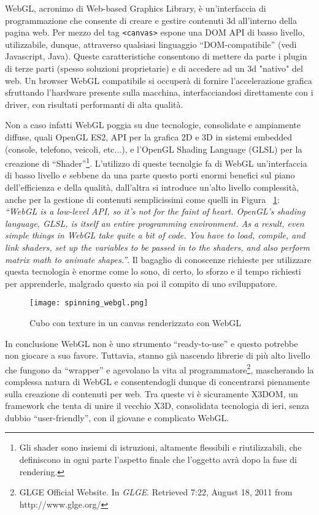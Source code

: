 WebGL, acronimo di Web-based Graphics Library, è un'interfaccia di programmazione che consente di creare e gestire contenuti 3d all'interno della pagina web. Per mezzo del tag \texttt{<canvas>} espone una DOM API di basso livello, utilizzabile, dunque, attraverso qualsiasi linguaggio ``DOM-compatibile'' (vedi Javascript, Java). Queste caratteristiche consentono di mettere da parte i plugin di terze parti (spesso soluzioni proprietarie) e di accedere ad un 3d "nativo" del web. Un browser WebGL compatibile si occuperà di fornire l'accelerazione grafica sfruttando l'hardware presente sulla macchina, interfacciandosi direttamente con i driver, con risultati performanti di alta qualità.

Non a caso infatti WebGL poggia su due tecnologie, consolidate e ampiamente diffuse, quali OpenGL ES2, API per la grafica 2D e 3D in sistemi embedded (console, telefono, veicoli, etc...), e l'OpenGL Shading Language (GLSL) per la creazione di ``Shader''\footnote{Gli shader sono insiemi di istruzioni, altamente flessibili e riutilizzabili, che definiscono in ogni parte l'aspetto finale che l'oggetto avrà dopo la fase di rendering.}. L'utilizzo di queste tecnolgie fa di WebGL un'interfaccia di basso livello e sebbene da una parte questo porti enormi benefici sul piano dell'efficienza e della qualità, dall'altra si introduce un'alto livello complessità, anche per la gestione di contenuti semplicissimi come quelli in Figura ~\ref{label:spinwebgl}: \textit{``WebGL is a low-level API, so it's not for the faint of heart. OpenGL's shading language, GLSL, is itself an entire programming environment. As a result, even simple things in WebGL take quite a bit of code. You have to load, compile, and link shaders, set up the variables to be passed in to the shaders, and also perform matrix math to animate shapes.''}. Il bagaglio di conoscenze richieste per utilizzare questa tecnologia è enorme come lo sono, di certo, lo sforzo e il tempo richiesti per apprenderle, malgrado questo sia poi il compito di uno sviluppatore.

\begin{figure}[Ht]
\centering
\texttt{[image: spinning\_webgl.png]}
\caption{Cubo con texture in un canvas renderizzato con WebGL}
\label{label:spinwebgl}
\end{figure}

In conclusione WebGL non è uno strumento ``ready-to-use'' e questo potrebbe non giocare a suo favore. Tuttavia, stanno già nascendo librerie di più alto livello che fungono da ``wrapper'' e agevolano la vita al programmatore\footnote{GLGE Official Website. In \textit{GLGE}. Retrieved 7:22, August 18, 2011 from http://www.glge.org/}, mascherando la complessa natura di WebGL e consentendogli dunque di concentrarsi pienamente sulla creazione di contenuti per web. Tra queste vi è sicuramente X3DOM, un framework che tenta di unire il vecchio X3D, consolidata tecnologia di ieri, senza dubbio ``user-friendly'', con il giovane e complicato WebGL.


